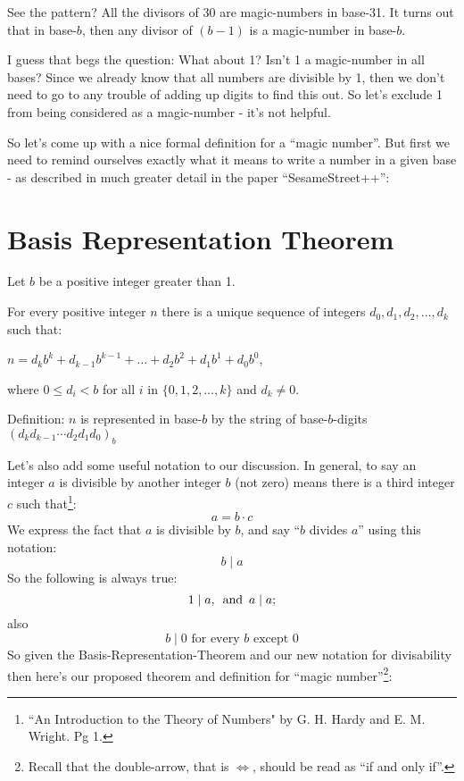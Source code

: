 \documentclass{article}
\newenvironment{jprIn}{\begin{adjustwidth}{2em}{}}{\end{adjustwidth}}
\begin{document}
See the pattern? All the divisors of 30 are magic-numbers in base-31.
It turns out that in base-$b$, then any divisor of $(b-1)$ is a magic-number in base-$b$.

I guess that begs the question: What about 1? Isn't 1 a magic-number in all bases?
Since we already know that all numbers are divisible by 1,
then we don't need to go to any trouble of adding up digits to find this out.
So let's exclude 1 from being considered as a magic-number - it's not helpful.

So let's come up with a nice formal definition for a ``magic number''.
But first we need to remind ourselves exactly
what it means to write a number in a given base - as described in
much greater detail in the paper ``SesameStreet++'':

\section*{Basis Representation Theorem}
\begin{jprIn}
Let $b$ be a positive integer greater than 1.

For every positive integer $n$ there is a unique sequence
of integers $d_0, d_1, d_2,\dots{},d_k$ such that:

\hspace{3em}$n=d_kb^k+d_{k-1}b^{k-1}+\dots+d_2b^2+d_1b^1+d_0b^0$,

where $0\le{}d_i<b$ for all $i$ in $\{0,1,2,\dots{},k\}$ and $d_k\ne0$.

Definition: $n$ is represented in base-$b$ by the string
of base-$b$-digits $(d_kd_{k-1}{\cdots}d_2d_1d_0)_b$
\end{jprIn}
\bigskip

Let's also add some useful notation to our discussion.
In general, to say an integer $a$ is divisible by another integer $b$
(not zero) means there is a third integer $c$ such that\footnote{``An
Introduction to the Theory of Numbers" by G. H. Hardy and E. M. Wright. Pg 1.}:
\[a=b\cdot{}c\]
We express the fact that $a$ is divisible by $b$, and say
``$b$ divides $a$'' using this notation:
\[b\mid{}a\]
So the following is always true:
\[1\mid{}a,
\text{\hspace{0.5em}and\hspace{0.5em}}a\mid{}a;\]
also
\[b\mid{}0\text{ for every }b\text{ except }0\]
%
So given the Basis-Representation-Theorem and our new notation for divisability
then here's our
proposed theorem and definition for ``magic number''\footnote{Recall that
the double-arrow, that is $\Leftrightarrow$, should be read as ``if and only if''.}:
\end{document}
